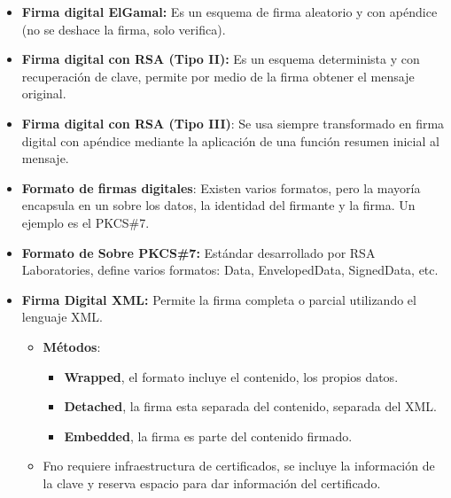 \documentclass[12pt, twoside, openright]{report} %
\begin{document}
\begin{itemize}
\begin{itemize}
      \end{itemize}
    \item \textbf{Firma digital ElGamal:} Es un esquema de firma aleatorio y
      con apéndice (no se deshace la firma, solo verifica).
      
    \item \textbf{Firma digital con RSA (Tipo II):} Es un esquema
      determinista y con recuperación de clave, permite por medio de la
      firma obtener el mensaje original.
      
    \item \textbf{Firma digital con RSA (Tipo III)}: Se usa siempre
      transformado en firma digital con apéndice mediante la aplicación
      de una función resumen inicial al mensaje.
      
    \item \textbf{Formato de firmas digitales}: Existen varios formatos,
      pero la mayoría encapsula en un sobre los datos, la identidad del
      firmante y la firma. Un ejemplo es el PKCS\#7.
      
    \item \textbf{Formato de Sobre PKCS\#7:} Estándar desarrollado por RSA
      Laboratories, define varios formatos: Data, EnvelopedData,
      SignedData, etc.
      
    \item \textbf{Firma Digital XML:} Permite la firma completa o parcial
      utilizando el lenguaje XML.
      

      \begin{itemize}
      \item \textbf{Métodos}:
        

        \begin{itemize}
        \item \textbf{Wrapped}, el formato incluye el contenido, los propios
          datos.
          
        \item \textbf{Detached}, la firma esta separada del contenido,
          separada del XML.
          
        \item \textbf{Embedded}, la firma es parte del contenido firmado.
          
        \end{itemize}
      \item Fno requiere infraestructura de certificados, se incluye la
        información de la clave y reserva espacio para dar información
        del certificado.
        
      \end{itemize}
    \end{itemize}
\end{document}
